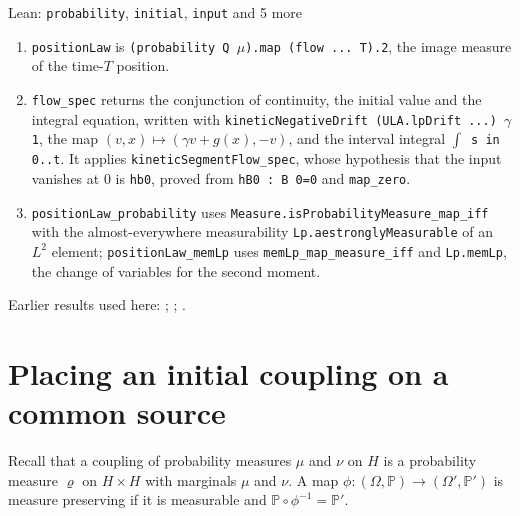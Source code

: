 \documentclass[11pt,a4paper]{article}
\begin{document}
\begin{leanbox}{Lean: \texttt{probability}, \texttt{initial}, \texttt{input} and 5 more}
\begin{enumerate}
\item \texttt{position\allowbreak{}Law} is \texttt{(probability Q \ensuremath{\mu}).\allowbreak{}map (flow .\allowbreak{}.\allowbreak{}.\allowbreak{} T).\allowbreak{}2}, the image measure of the time-\(T\) position.

\item \texttt{flow\_\allowbreak{}spec} returns the conjunction of continuity, the initial value and the integral equation, written with \texttt{kinetic\allowbreak{}Negative\allowbreak{}Drift (ULA.\allowbreak{}lp\allowbreak{}Drift .\allowbreak{}.\allowbreak{}.\allowbreak{}) \ensuremath{\gamma} 1}, the map \((v,x)\mapsto(\gamma v+g(x),-v)\), and the interval integral \texttt{\ensuremath{\int} s in 0.\allowbreak{}.\allowbreak{}t}. It applies \texttt{kinetic\allowbreak{}Segment\allowbreak{}Flow\_\allowbreak{}spec}, whose hypothesis that the input vanishes at \(0\) is \texttt{hb0}, proved from \texttt{h\allowbreak{}B0 : B 0=0} and \texttt{map\_\allowbreak{}zero}.

\item \texttt{position\allowbreak{}Law\_\allowbreak{}probability} uses \texttt{Measure.\allowbreak{}is\allowbreak{}Probability\allowbreak{}Measure\_\allowbreak{}map\_\allowbreak{}iff} with the almost-everywhere measurability \texttt{Lp.\allowbreak{}aestrongly\allowbreak{}Measurable} of an \(L^2\) element; \texttt{position\allowbreak{}Law\_\allowbreak{}mem\allowbreak{}Lp} uses \texttt{mem\allowbreak{}Lp\_\allowbreak{}map\_\allowbreak{}measure\_\allowbreak{}iff} and \texttt{Lp.\allowbreak{}mem\allowbreak{}Lp}, the change of variables for the second moment.

\end{enumerate}
\end{leanbox}


Earlier results used here: \cite[Section~3.13.2]{LangevinLean2026ULASC}; \cite[Section~3.13.5]{LangevinLean2026ULASC}; \cite[Section~3.17.1]{LangevinLean2026ULASC}.

\section{\texorpdfstring{Placing an initial coupling on a common source}{Placing an initial coupling on a common source}}


Recall that a coupling of probability measures \(\mu\) and \(\nu\) on \(H\) is a probability measure \(\varrho\) on \(H\times H\) with marginals \(\mu\) and \(\nu\). A map \(\phi:(\Omega,\mathbb P)\to(\Omega',\mathbb P')\) is measure preserving if it is measurable and \(\mathbb P\circ\phi^{-1}=\mathbb P'\).
\end{document}
